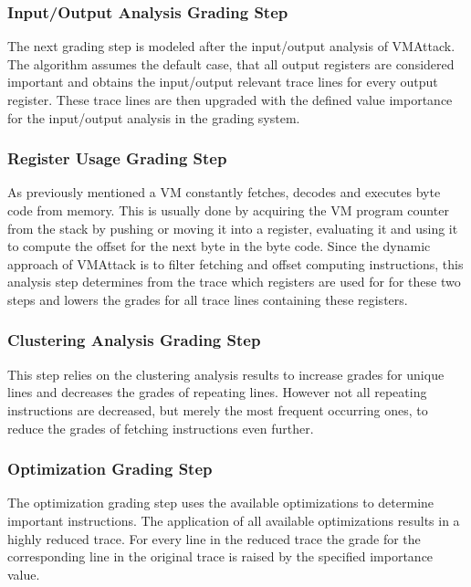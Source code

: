 \documentclass[10pt,twoside,a4paper,bibliography=totoc]{scrbook}
\begin{document}
\subsubsection{Input/Output Analysis Grading Step}
The next grading step is modeled after the input/output analysis of VMAttack. The algorithm assumes the default case, that all output registers are considered important and obtains the input/output relevant trace lines for every output register.
These trace lines are then upgraded with the defined value importance for the input/output analysis in the grading system.

\subsubsection{Register Usage Grading Step}
As previously mentioned a VM constantly fetches, decodes and executes byte code from memory. This is usually done by acquiring the VM program counter from the stack by pushing or moving it into a register, evaluating it and using it to compute the offset for the next byte in the byte code. 
Since the dynamic approach of VMAttack is to filter fetching and offset computing instructions, this analysis step determines from the trace which registers are used for for these two steps and lowers the grades for all trace lines containing these registers.

\subsubsection{Clustering Analysis Grading Step}
This step relies on the clustering analysis results to increase grades for unique lines and decreases the grades of repeating lines. 
However not all repeating instructions are decreased, but merely the most frequent occurring ones, to reduce the grades of fetching instructions even further.


\subsubsection{Optimization Grading Step}
The optimization grading step uses the available optimizations to determine important instructions. The application of all available optimizations results in a highly reduced trace. 
For every line in the reduced trace the grade for the corresponding line in the original trace is raised by the specified importance value.
\end{document}
